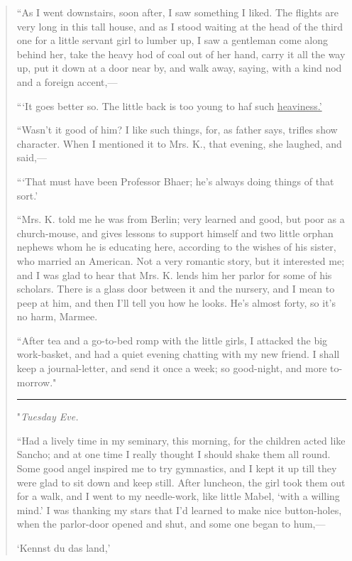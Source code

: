 \begin{quote}
``As I went downstairs, soon after, I saw something I liked. The flights
are very long in this tall house, and as I stood waiting at the head of
the third one for a little servant girl to lumber up, I saw a gentleman
come along behind her, take the heavy hod of coal out of her hand, carry
it all the way up, put it down at a door near by, and walk away, saying,
with a kind nod and a foreign accent,---

```It goes better so. The little back is too young to haf
such \underline{heaviness.'}

``Wasn't it good of him? I like such things, for, as
father says, trifles show character. When I mentioned it to Mrs. K.,
that evening, she laughed, and said,---

```That must have been Professor Bhaer;
he's always doing things of that sort.'

``Mrs. K. told me he was from Berlin; very learned and good, but poor as
a church-mouse, and gives lessons to support himself and two little
orphan nephews whom he is educating here, according to the wishes of his
sister, who married an American. Not a very romantic story, but it
interested me; and I was glad to hear that Mrs. K. lends him her parlor
for some of his scholars. There is a glass door between it and the
nursery, and I mean to peep at him, and then I'll tell
you how he looks. He's almost forty, so
it's no harm, Marmee.

``After tea and a go-to-bed romp with the little girls, I attacked the
big work-basket, and had a quiet evening chatting with my new friend. I
shall keep a journal-letter, and send it once a week; so good-night, and
more to-morrow."

\begin{center}\rule{0.5\linewidth}{0.5pt}\end{center}

"\emph{Tuesday Eve.}

``Had a lively time in my seminary, this morning, for the children acted
like Sancho; and at one time I really thought I should shake them all
round. Some good angel inspired me to try gymnastics, and I kept it up
till they were glad to sit down and keep still. After luncheon, the girl
took them out for a walk, and I went to my needle-work, like little
Mabel, `with a willing mind.' I was
thanking my stars that I'd learned to make nice
button-holes, when the parlor-door opened and shut, and some one began
to hum,---

`Kennst du das land,'


\end{quote}
